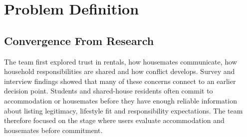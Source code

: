 \documentclass[11pt,a4paper]{article}
\begin{document}
\section{Problem Definition}

\subsection{Convergence From Research}

The team first explored trust in rentals, how housemates communicate, how household responsibilities are shared and how conflict develops. Survey and interview findings showed that many of these concerns connect to an earlier decision point. Students and shared-house residents often commit to accommodation or housemates before they have enough reliable information about listing legitimacy, lifestyle fit and responsibility expectations. The team therefore focused on the stage where users evaluate accommodation and housemates before commitment.
\end{document}
